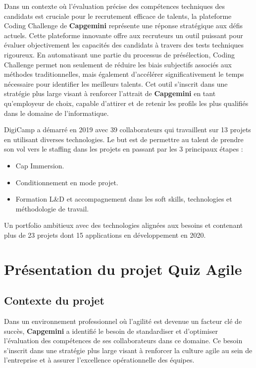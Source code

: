\documentclass[12pt,a4paper]{report}
\begin{document}
Dans un contexte où l'évaluation précise des compétences techniques des candidats est cruciale pour le recrutement efficace de talents, la plateforme Coding Challenge de \textbf{Capgemini} représente une réponse stratégique aux défis actuels. Cette plateforme innovante offre aux recruteurs un outil puissant pour évaluer objectivement les capacités des candidats à travers des tests techniques rigoureux. En automatisant une partie du processus de présélection, Coding Challenge permet non seulement de réduire les biais subjectifs associés aux méthodes traditionnelles, mais également d'accélérer significativement le temps nécessaire pour identifier les meilleurs talents. Cet outil s'inscrit dans une stratégie plus large visant à renforcer l'attrait de \textbf{Capgemini} en tant qu'employeur de choix, capable d'attirer et de retenir les profils les plus qualifiés dans le domaine de l'informatique.

DigiCamp a démarré en 2019 avec 39 collaborateurs qui travaillent sur 13 projets en utilisant diverses technologies. Le but est de permettre au talent de prendre son vol vers le staffing dans les projets en passant par les 3 principaux étapes :

\begin{itemize}
\item Cap Immersion.
\item Conditionnement en mode projet.
\item Formation L\&D et accompagnement dans les soft skills, technologies et méthodologie de travail.
\end{itemize}

Un portfolio ambitieux avec des technologies alignées aux besoins et contenant plus de 23 projets dont 15 applications en développement en 2020.

\section{Présentation du projet Quiz Agile}

\subsection{Contexte du projet}

Dans un environnement professionnel où l'agilité est devenue un facteur clé de succès, \textbf{Capgemini} a identifié le besoin de standardiser et d'optimiser l'évaluation des compétences de ses collaborateurs dans ce domaine. Ce besoin s'inscrit dans une stratégie plus large visant à renforcer la culture agile au sein de l'entreprise et à assurer l'excellence opérationnelle des équipes.
\end{document}
